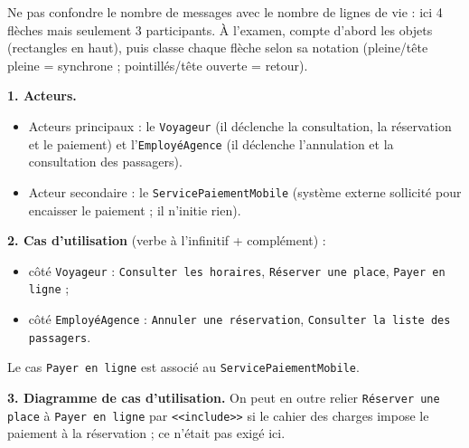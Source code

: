 \documentclass[11pt]{article}
\begin{document}
\begin{attention}
Ne pas confondre le nombre de messages avec le nombre de lignes de vie : ici 4 flèches mais seulement 3 participants. À l'examen, compte d'abord les objets (rectangles en haut), puis classe chaque flèche selon sa notation (pleine/tête pleine = synchrone ; pointillés/tête ouverte = retour).
\end{attention}

\begin{corrige}
\textbf{1. Acteurs.}
\begin{itemize}
\item Acteurs principaux : le \texttt{Voyageur} (il déclenche la consultation, la réservation et le paiement) et l'\texttt{EmployéAgence} (il déclenche l'annulation et la consultation des passagers).
\item Acteur secondaire : le \texttt{ServicePaiementMobile} (système externe sollicité pour encaisser le paiement ; il n'initie rien).
\end{itemize}

\textbf{2. Cas d'utilisation} (verbe à l'infinitif + complément) :
\begin{itemize}
\item côté \texttt{Voyageur} : \texttt{Consulter les horaires}, \texttt{Réserver une place}, \texttt{Payer en ligne} ;
\item côté \texttt{EmployéAgence} : \texttt{Annuler une réservation}, \texttt{Consulter la liste des passagers}.
\end{itemize}
Le cas \texttt{Payer en ligne} est associé au \texttt{ServicePaiementMobile}.

\textbf{3. Diagramme de cas d'utilisation.}
On peut en outre relier \texttt{Réserver une place} à \texttt{Payer en ligne} par \texttt{<<include>>} si le cahier des charges impose le paiement à la réservation ; ce n'était pas exigé ici.
\end{corrige}
\end{document}
